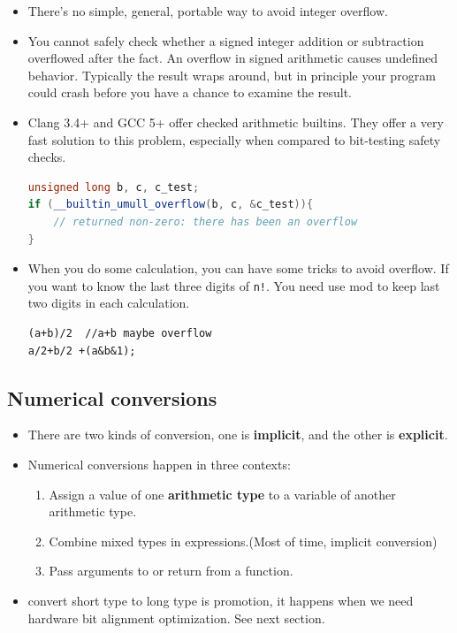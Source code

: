 \documentclass[a4paper,11pt,twoside]{book}
\begin{document}
\begin{itemize}
\begin{enumerate}
		\item Judge it after calculation
\begin{lstlisting}[numbers = none]
uint32 a,b;
uint32 result = a + b;
if (result < a) {
	//Overflow
}
\end{lstlisting}
\end{enumerate}
	
	
	\item There's no simple, general, portable way to avoid integer overflow.
	
	\item You cannot safely check whether a signed integer addition or subtraction overflowed after the fact. An overflow in signed arithmetic causes undefined behavior. Typically the result wraps around, but in principle your program could crash before you have a chance to examine the result.
	
	\item Clang 3.4+ and GCC 5+ offer checked arithmetic builtins. They offer a very fast solution to this problem, especially when compared to bit-testing safety checks.
\begin{lstlisting}[frame=single, language=c++]
unsigned long b, c, c_test;
if (__builtin_umull_overflow(b, c, &c_test)){
	// returned non-zero: there has been an overflow
}
\end{lstlisting}
	
\item When you do some calculation, you can have some tricks to avoid overflow. If you  want to know the last three digits of \texttt{n!}. You need use mod to keep last two digits in each calculation.
\begin{lstlisting}[numbers = none]
(a+b)/2  //a+b maybe overflow
a/2+b/2 +(a&b&1);
\end{lstlisting}

\end{itemize}

\subsection{Numerical conversions}

\begin{itemize}
	\item There are two kinds of conversion, one is \textbf{implicit}, and the other is \textbf{explicit}.
	\item Numerical conversions happen in three contexts:
	\begin{enumerate}
		\item Assign a value of one \textbf{arithmetic type} to a variable of another arithmetic type.
		
		\item Combine mixed types in expressions.(Most of time, implicit conversion)
		
		\item Pass arguments to or return from a function.
	\end{enumerate}
	\item convert short type to long type is promotion, it happens when we need hardware bit alignment optimization. See next section. 
\end{itemize}
\end{document}
